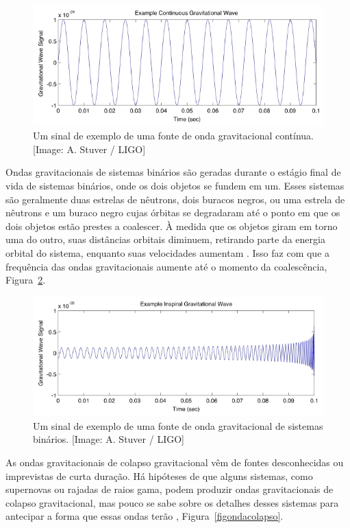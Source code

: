 \begin{figure}[ht]
\centering
\includegraphics[width=.9\textwidth]{figuras/continuous_tn.jpg}
\caption{Um sinal de exemplo de uma fonte de onda gravitacional contínua. [Image: A. Stuver / LIGO]}
\label{figondacontinua}
\end{figure}

Ondas gravitacionais de sistemas binários são geradas durante o estágio final de vida de sistemas binários, onde os dois objetos se fundem em um. Esses sistemas são geralmente duas estrelas de nêutrons, dois buracos negros, ou uma estrela de nêutrons e um buraco negro cujas órbitas se degradaram até o ponto em que os dois objetos estão prestes a coalescer. À medida que os objetos giram em torno uma do outro, suas distâncias orbitais diminuem, retirando parte da energia orbital do sistema, enquanto suas velocidades aumentam \cite{Liu_2018}. Isso faz com que a frequência das ondas gravitacionais aumente até o momento da coalescência, Figura~\ref{figondainspiral}.

\begin{figure}[ht]
\centering
\includegraphics[width=.9\textwidth]{figuras/inspiral_tn.jpg}
\caption{Um sinal de exemplo de uma fonte de onda gravitacional de sistemas binários. [Image: A. Stuver / LIGO]}
\label{figondainspiral}
\end{figure}

As ondas gravitacionais de colapso gravitacional vêm de fontes desconhecidas ou imprevistas de curta duração. Há hipóteses de que alguns sistemas, como supernovas ou rajadas de raios gama, podem produzir ondas gravitacionais de colapso gravitacional, mas pouco se sabe sobre os detalhes desses sistemas para antecipar a forma que essas ondas terão \cite{Christensen_2018}, Figura~\ref{figondacolapso}.

